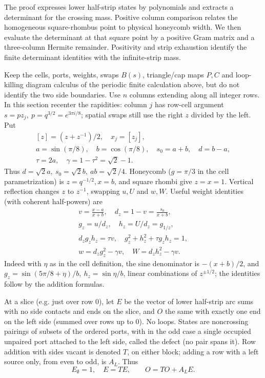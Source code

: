 \documentclass[11pt]{article}
\numberwithin{equation}{section}
\theoremstyle{definition}\newtheorem{definition}[theorem]{Definition}
\theoremstyle{remark}\newtheorem{remark}[theorem]{Remark}
\begin{document}
The proof expresses lower half-strip states by polynomials and extracts
a determinant for the crossing mass. Positive column comparison relates
the homogeneous square-rhombus point to physical honeycomb width. We then
evaluate the determinant at that square point by a positive Gram matrix
and a three-column Hermite remainder. Positivity and strip exhaustion
identify the finite determinant identities with the infinite-strip mass.

Keep the cells, ports, weights, swaps \(B(s)\), triangle/cap maps \(P,C\) and loop-killing diagram calculus of the periodic finite calculation above, but do not identify the two side boundaries. Use \(n\) columns extending along all integer rows. In this section recenter the rapidities: column \(j\) has row-cell argument \(s=p z_j,\ p=q^{3/2}=e^{3\pi i/8}\); spatial swaps still use the right \(z\) divided by the left. Put
\[
\begin{gathered}
 [z]=(z+z^{-1})/2,\quad x_j=[z_j],\\
 a=\sin(\pi/8),\quad b=\cos(\pi/8),\quad s_0=a+b,\quad d=b-a,\\
 \tau=2a,\quad \gamma=1-\tau^2=\sqrt2-1 .
\end{gathered}
\]
Thus \(d=\sqrt2 a,\ s_0=\sqrt2 b,\ ab=\sqrt2/4\). Honeycomb (\(g=\pi/3\) in the cell parametrization) is \(z=q^{-1/2},x=b\), and square rhombi give \(z=x=1\). Vertical reflection changes \(z\) to \(z^{-1}\), swapping \(u,U\) and \(w,W\). Useful weight identities (with coherent half-powers) are
\[
\begin{gathered}
 v=\frac{x-a}{x+b},\quad d_z=1-v=\frac{s_0}{x+b},\\
 g_z=u/d_z,\quad h_z=U/d_z=g_{1/z},\\
 d_z g_z h_z=\tau v,\quad g_z^2+h_z^2+\tau g_z h_z=1,\\
 w=d_z g_z^2-\gamma v,\quad W=d_z h_z^2-\gamma v .
\end{gathered}
\]
Indeed with \(\eta\) as in the cell definition, the sine denominator is \(-(x+b)/2\), and \(g_z=\sin(5\pi/8+\eta)/b,\ h_z=\sin\eta/b\), linear combinations of \(z^{\pm1/2}\); the identities follow by the addition formulas.

At a slice (e.g. just over row 0), let \(E\) be the vector of lower half-strip arc sums with no side contacts and ends on the slice, and \(O\) the same with exactly one end on the left side (summed over rows up to 0). No loops. States are noncrossing pairings of subsets of the ordered ports, with in the odd case a single occupied unpaired port attached to the left side, called the defect (no pair spans it). Row addition with sides vacant is denoted \(T\), on either block; adding a row with a left source only, from even to odd, is \(A_L\). Thus
\[
 E_\emptyset=1,\quad E=T E,\qquad O=T O+A_L E .
\]
\end{document}
